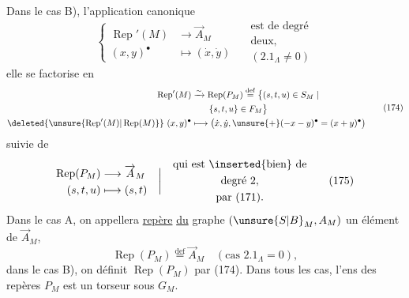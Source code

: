 Dans le cas B), l'application canonique
\[
 \left\{\begin{aligned}\operatorname{Rep}'(M)&\longrightarrow\overrightarrow A_M\\
 (x,y)^{\bullet}&\longmapsto(\dot x,\dot y)\end{aligned}\right.
 \quad\begin{gathered}\text{est de degré}\\\text{deux,}\\(2.1_\Lambda\ne0)\end{gathered}\tag*{(173)}
\]
elle se factorise en
\[
\begin{aligned}
 \operatorname{Rep}'(M)&\xrightarrow{\sim}\operatorname{Rep}(P_M)\overset{\mathrm{def}}{=}
 \bigl\{(s,t,u)\in S_M\mid\\
 &\qquad\{s,t,u\}\in F_M\bigr\}\\
 \deleted{\unsure{\operatorname{Rep}'(M)|\operatorname{Rep}(M)}}\ (x,y)^{\bullet}&\longmapsto
 \bigl(\dot x,\dot y,\unsure{+}(-x-y)^{\bullet}=(x+y)^{\bullet}\bigr)
\end{aligned}\tag*{(174)}
\]
suivie de
\[
 \begin{aligned}\operatorname{Rep}(P_M)&\longrightarrow\overrightarrow A_M\\
 (s,t,u)&\longmapsto(s,t)\end{aligned}\quad\bigg|\quad
 \begin{gathered}\text{qui est \inserted{bien} de}\\\text{degré }2,\\\text{par (171).}\end{gathered}\tag*{(175)}
\]
Dans le cas A, on appellera \uline{repère} \uline{du} graphe  $(\unsure{S|B}_M,A_M)$ un élément de $\overrightarrow A_M$, 
\[
 \operatorname{Rep}(P_M)\overset{\mathrm{def}}{=}\overrightarrow A_M\quad(\text{cas }2.1_{\Lambda}=0),\tag*{(176)}
\]
dans le cas B), on définit $\operatorname{Rep}(P_M)$  par (174). Dans tous les cas, l'ens des repères  $P_M$ est un torseur sous $G_M$.

